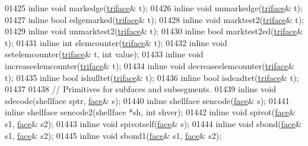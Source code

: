 \begin{DoxyCode}
01425   \textcolor{keyword}{inline} \textcolor{keywordtype}{void} markedge(\hyperlink{classtetgenmesh_1_1triface}{triface}& t);
01426   \textcolor{keyword}{inline} \textcolor{keywordtype}{void} unmarkedge(\hyperlink{classtetgenmesh_1_1triface}{triface}& t);
01427   \textcolor{keyword}{inline} \textcolor{keywordtype}{bool} edgemarked(\hyperlink{classtetgenmesh_1_1triface}{triface}& t);
01428   \textcolor{keyword}{inline} \textcolor{keywordtype}{void} marktest2(\hyperlink{classtetgenmesh_1_1triface}{triface}& t);
01429   \textcolor{keyword}{inline} \textcolor{keywordtype}{void} unmarktest2(\hyperlink{classtetgenmesh_1_1triface}{triface}& t);
01430   \textcolor{keyword}{inline} \textcolor{keywordtype}{bool} marktest2ed(\hyperlink{classtetgenmesh_1_1triface}{triface}& t);
01431   \textcolor{keyword}{inline} \textcolor{keywordtype}{int}  elemcounter(\hyperlink{classtetgenmesh_1_1triface}{triface}& t);
01432   \textcolor{keyword}{inline} \textcolor{keywordtype}{void} setelemcounter(\hyperlink{classtetgenmesh_1_1triface}{triface}& t, \textcolor{keywordtype}{int} value);
01433   \textcolor{keyword}{inline} \textcolor{keywordtype}{void} increaseelemcounter(\hyperlink{classtetgenmesh_1_1triface}{triface}& t);
01434   \textcolor{keyword}{inline} \textcolor{keywordtype}{void} decreaseelemcounter(\hyperlink{classtetgenmesh_1_1triface}{triface}& t);
01435   \textcolor{keyword}{inline} \textcolor{keywordtype}{bool} ishulltet(\hyperlink{classtetgenmesh_1_1triface}{triface}& t);
01436   \textcolor{keyword}{inline} \textcolor{keywordtype}{bool} isdeadtet(\hyperlink{classtetgenmesh_1_1triface}{triface}& t);
01437  
01438   \textcolor{comment}{// Primitives for subfaces and subsegments.}
01439   \textcolor{keyword}{inline} \textcolor{keywordtype}{void} sdecode(shellface sptr, \hyperlink{classtetgenmesh_1_1face}{face}& s);
01440   \textcolor{keyword}{inline} shellface sencode(\hyperlink{classtetgenmesh_1_1face}{face}& s);
01441   \textcolor{keyword}{inline} shellface sencode2(shellface *sh, \textcolor{keywordtype}{int} shver);
01442   \textcolor{keyword}{inline} \textcolor{keywordtype}{void} spivot(\hyperlink{classtetgenmesh_1_1face}{face}& s1, \hyperlink{classtetgenmesh_1_1face}{face}& s2);
01443   \textcolor{keyword}{inline} \textcolor{keywordtype}{void} spivotself(\hyperlink{classtetgenmesh_1_1face}{face}& s);
01444   \textcolor{keyword}{inline} \textcolor{keywordtype}{void} sbond(\hyperlink{classtetgenmesh_1_1face}{face}& s1, \hyperlink{classtetgenmesh_1_1face}{face}& s2);
01445   \textcolor{keyword}{inline} \textcolor{keywordtype}{void} sbond1(\hyperlink{classtetgenmesh_1_1face}{face}& s1, \hyperlink{classtetgenmesh_1_1face}{face}& s2);

\end{DoxyCode}
